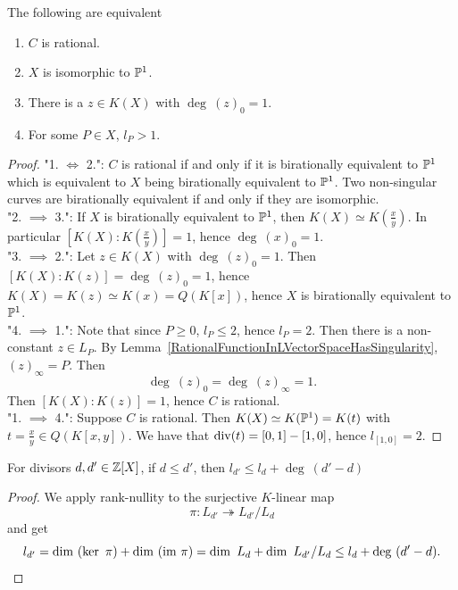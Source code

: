     \begin{corollary}\label{EquivalentFormulationsOfBeingRational}
        The following are equivalent
        \begin{enumerate}
            \item $C$ is rational.
            \item $X$ is isomorphic to $\mathbb{P}^1$.
            \item There is a $z\in K(X)$ with $\deg\ (z)_0 = 1$. 
            \item For some $P\in X$, $l_P>1$.
        \end{enumerate}
    \end{corollary}
    \begin{proof}
        "1. $\iff$ 2.": $C$ is rational if and only if it is birationally equivalent to $\mathbb{P}^1$ which is equivalent to $X$ being birationally equivalent to $\mathbb{P}^1$. Two non-singular curves are birationally equivalent if and only if they are isomorphic.\\ 
        "2. $\implies$ 3.":  If $X$ is birationally equivalent to $\mathbb{P}^1$, then $K(X)\simeq K(\frac{x}{y})$. In particular $[K(X) : K(\frac{x}{y})]=1$, hence $\deg \ (x)_0=1$.\\
        "3. $\implies$ 2.": Let $z\in K(X)$ with $\deg \ (z)_0 = 1$. Then $[K(X): K(z)]=\deg \ (z)_0 = 1$, hence $K(X)= K(z)\simeq K(x)=Q(K[x])$, hence $X$ is birationally equivalent to $\mathbb{P}^1$.\\
        "4. $\implies$ 1.": Note that since $P\geq 0$, $l_P\leq 2$, hence $l_P=2$. Then there is a non-constant $z\in L_P$. By Lemma~\ref{RationalFunctionInLVectorSpaceHasSingularity}, $(z)_\infty = P$. Then 
        $$
            \deg \ (z)_0 = \deg\ (z)_\infty = 1. 
        $$ 
        Then $[K(X):K(z)]=1$, hence $C$ is rational.\\
        "1. $\implies$ 4.": Suppose $C$ is rational.  Then $K(X)\simeq K(\mathbb{P}^1) = K(t)$ with $t = \frac{x}{y}\in Q(K[x,y])$. We have that $\mathrm{div}(t) = [0,1]-[1,0]$, hence $l_{[1,0]}=2$.     
    \end{proof}
    \begin{lemma}\label{SmallerDivisorImpliesSmallerDimension}
        For divisors $d,d'\in \mathbb{Z}[X]$, if $d\leq d'$, then $l_{d'} \leq l_{d}+\deg \ (d'-d)$
    \end{lemma}
    \begin{proof}
        We apply rank-nullity to the surjective $K$-linear map 
        $$
            \pi: L_{d'} \twoheadrightarrow L_{d'}/L_d
        $$
        and get 
        $$
            l_{d'} = \dim \ (\ker \ \pi) + \dim \ (\im\ \pi) = \dim \ L_d + \dim \ L_{d'}/L_{d}\leq  l_d+\deg \ (d'-d). 
        $$
    \end{proof}
